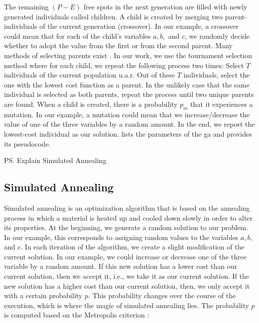 

The remaining $(P-E)$ free spots in the next generation are filled with newly generated individuals called children.
A child is created by merging two parent-individuals of the current generation (crossover).
In our example, a crossover could mean that for each of the child's variables $a,b,$ and $c$, we randomly decide whether to adopt the value from the first or from the second parent.
Many methods of selecting parents exist \cite{ga-1}.
In our work, we use the tournament selection method \cite{ga-tourn} where for each child, we repeat the following process two times:
Select $T$ individuals of the current population u.a.r. 
Out of these $T$ individuals, select the one with the lowest cost function as a parent.
In the unlikely case that the same individual is selected as both parents, repeat the process until two unique parents are found.
When a child is created, there is a probability $p_m$ that it experiences a mutation.
In our example, a mutation could mean that we increase/decrease the value of one of the three variables by a random amount.
In the end, we report the lowest-cost individual as our solution.
 lists the parameters of the \gls{ga} and  provides its pseudocode.



\ps{Explain Simulated Annealing}

\subsection{Simulated Annealing}
\label{app:opt-sa}

Simulated annealing is an optimization algorithm that is based on the annealing process in which a material is heated up and cooled down slowly in order to alter its properties.
At the beginning, we generate a random solution to our problem.
In our example, this corresponds to assigning random values to the variables $a,b,$ and $c$.
In each iteration of the algorithm, we create a slight modification of the current solution.
In our example, we could increase or decrease one of the three variable by a random amount.
If this new solution has a lower cost than our current solution, then we accept it, i.e., we take it as our current solution.
If the new solution has a higher cost than our current solution, then, we only accept it with a certain probability $p$. 
This probability changes over the course of the execution, which is where the magic of simulated annealing lies.
The probability $p$ is computed based on the Metropolis criterion \cite{metropolis}:


